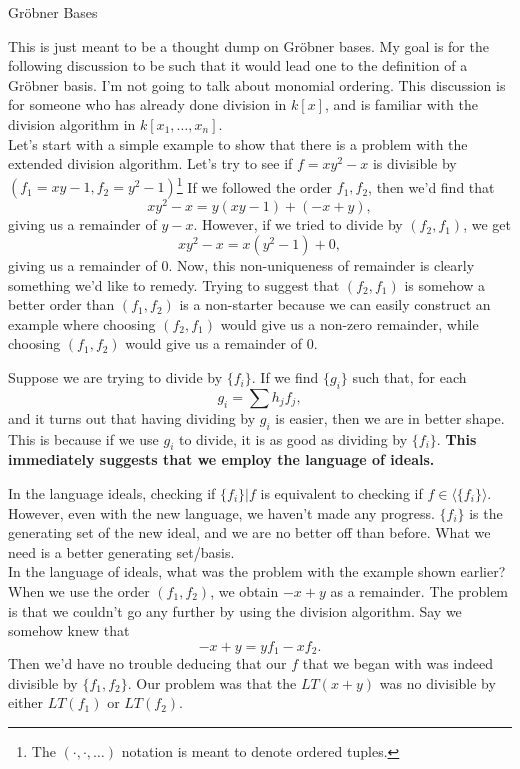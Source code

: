 \documentclass[10pt]{article}
\newcommand{\gb}{Gr\"{o}bner }
\newcommand*{\ideal}[1]{\langle#1\rangle}
\begin{document}
\begin{center}\sc\Large
\gb Bases
\end{center}

This is just meant to be a thought dump on \gb bases. My goal is for the following discussion to be such that it would lead one to the definition of a \gb basis. I'm not going to talk about monomial ordering. This discussion is for someone who has already done division in $k[x]$, and is familiar with the division algorithm in $k[x_1, \ldots, x_n]$. \\

Let's start with a simple example to show that there is a problem with the extended division algorithm. Let's try to see if $f = xy^2 - x$ is divisible by $(f_1 = xy - 1, f_2 = y^2 - 1)$\footnote{The $(\cdot, \cdot, \ldots)$ notation is meant to denote ordered tuples.} If we followed the order $f_1, f_2$, then we'd find that
\[
xy^2 - x = y(xy-1) + (-x + y),
\]
giving us a remainder of $y-x$. However, if we tried to divide by $(f_2, f_1)$, we get
\[
xy^2 - x = x(y^2-1) + 0,
\]
giving us a remainder of 0. Now, this non-uniqueness of remainder is clearly something we'd like to remedy. Trying to suggest that $(f_2, f_1)$ is somehow a better order than $(f_1, f_2)$ is a non-starter because we can easily construct an example where choosing $(f_2, f_1)$ would give us a non-zero remainder, while choosing $(f_1, f_2)$ would give us a remainder of 0. \\

\begin{ideabox}
Suppose we are trying to divide by $\{f_i\}$. If we find $\{g_i\}$  such that, for each 
\[
g_i = \sum h_jf_j,
\]
and it turns out that having dividing by $g_i$ is easier, then we are in better shape. This is because if we use $g_i$ to divide, it is as good as dividing by $\{f_i\}$. \textbf{This immediately suggests that we employ the language of ideals.}
\end{ideabox}

In the language ideals, checking if $\{f_i\} | f$ is equivalent to checking if $f \in \ideal{\{f_i\}}$. However, even with the new language, we haven't made any progress. $\{f_i\}$ is the generating set of the new ideal, and we are no better off than before. What we need is a better generating set/basis. \\

In the language of ideals, what was the problem with the example shown earlier? When we use the order $(f_1, f_2)$, we obtain $-x + y$ as a remainder. The problem is that we couldn't go any further by using the division algorithm. Say we somehow knew that
\[
-x + y = yf_1 - xf_2.
\]
Then we'd have no trouble deducing that our $f$ that we began with was indeed divisible by $\{f_1, f_2\}$. Our problem was that the $LT(x+y)$ was no divisible by either $LT(f_1)$ or $LT(f_2)$. 
\end{document}
